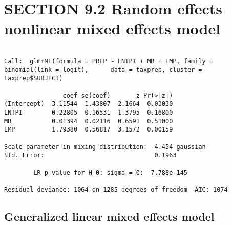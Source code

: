 \documentclass[]{book}
\newenvironment{Shaded}{\begin{snugshade}}{\end{snugshade}}
\newcommand{\CommentTok}[1]{\textcolor[rgb]{0.56,0.35,0.01}{\textit{#1}}}
\newcommand{\DataTypeTok}[1]{\textcolor[rgb]{0.13,0.29,0.53}{#1}}
\newcommand{\KeywordTok}[1]{\textcolor[rgb]{0.13,0.29,0.53}{\textbf{#1}}}
\newcommand{\NormalTok}[1]{#1}
\newcommand{\OperatorTok}[1]{\textcolor[rgb]{0.81,0.36,0.00}{\textbf{#1}}}
\begin{document}
\hypertarget{section-9.2-random-effects-nonlinear-mixed-effects-model}{%
\section{SECTION 9.2 Random effects nonlinear mixed effects model}\label{section-9.2-random-effects-nonlinear-mixed-effects-model}}

\begin{Shaded}
\end{Shaded}

\begin{verbatim}

Call:  glmmML(formula = PREP ~ LNTPI + MR + EMP, family = binomial(link = logit),      data = taxprep, cluster = taxprep$SUBJECT) 

                coef se(coef)       z Pr(>|z|)
(Intercept) -3.11544  1.43807 -2.1664  0.03030
LNTPI        0.22805  0.16531  1.3795  0.16800
MR           0.01394  0.02116  0.6591  0.51000
EMP          1.79380  0.56817  3.1572  0.00159

Scale parameter in mixing distribution:  4.454 gaussian 
Std. Error:                              0.1963 

        LR p-value for H_0: sigma = 0:  7.788e-145 

Residual deviance: 1064 on 1285 degrees of freedom  AIC: 1074 
\end{verbatim}

\hypertarget{generalized-linear-mixed-effects-model}{%
\subsection{Generalized linear mixed effects model}\label{generalized-linear-mixed-effects-model}}
\end{document}
